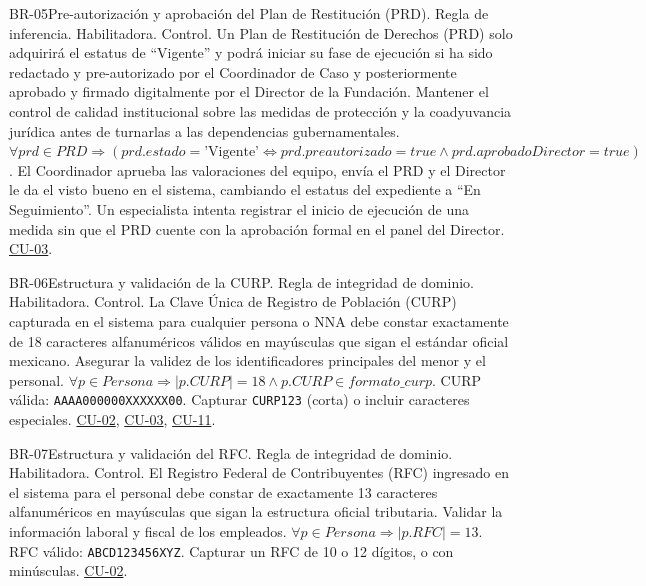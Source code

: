 \begin{BussinesRule}{BR-05}{Pre-autorización y aprobación del Plan de Restitución (PRD).}
	\BRitem[Tipo:] Regla de inferencia. 
	\BRitem[Clase:] Habilitadora. 
	\BRitem[Nivel:] Control.
	\BRitem[Descripción:] Un Plan de Restitución de Derechos (PRD) solo adquirirá el estatus de ``Vigente'' y podrá iniciar su fase de ejecución si ha sido redactado y pre-autorizado por el Coordinador de Caso y posteriormente aprobado y firmado digitalmente por el Director de la Fundación.
	\BRitem[Motivación:] Mantener el control de calidad institucional sobre las medidas de protección y la coadyuvancia jurídica antes de turnarlas a las dependencias gubernamentales.
	\BRitem[Sentencia:] $\forall prd \in PRD \Rightarrow (prd.estado = \mbox{'Vigente'} \Leftrightarrow prd.preautorizado = true \land prd.aprobadoDirector = true)$.
	 El Coordinador aprueba las valoraciones del equipo, envía el PRD y el Director le da el visto bueno en el sistema, cambiando el estatus del expediente a ``En Seguimiento''.
	 Un especialista intenta registrar el inicio de ejecución de una medida sin que el PRD cuente con la aprobación formal en el panel del Director.
	 \hyperlink{CU-03}{CU-03}.
\end{BussinesRule}

\begin{BussinesRule}{BR-06}{Estructura y validación de la CURP.}
	\BRitem[Tipo:] Regla de integridad de dominio.
	\BRitem[Clase:] Habilitadora.
	\BRitem[Nivel:] Control.
	\BRitem[Descripción:] La Clave Única de Registro de Población (CURP) capturada en el sistema para cualquier persona o NNA debe constar exactamente de 18 caracteres alfanuméricos válidos en mayúsculas que sigan el estándar oficial mexicano.
	\BRitem[Motivación:] Asegurar la validez de los identificadores principales del menor y el personal.
	\BRitem[Sentencia:] $\forall p \in Persona \Rightarrow |p.CURP| = 18 \land p.CURP \in formato\_curp$.
	 CURP válida: \texttt{AAAA000000XXXXXX00}.
	 Capturar \texttt{CURP123} (corta) o incluir caracteres especiales.
	 \hyperlink{CU-02}{CU-02}, \hyperlink{CU-03}{CU-03}, \hyperlink{CU-11}{CU-11}.
\end{BussinesRule}

\begin{BussinesRule}{BR-07}{Estructura y validación del RFC.}
	\BRitem[Tipo:] Regla de integridad de dominio.
	\BRitem[Clase:] Habilitadora.
	\BRitem[Nivel:] Control.
	\BRitem[Descripción:] El Registro Federal de Contribuyentes (RFC) ingresado en el sistema para el personal debe constar de exactamente 13 caracteres alfanuméricos en mayúsculas que sigan la estructura oficial tributaria.
	\BRitem[Motivación:] Validar la información laboral y fiscal de los empleados.
	\BRitem[Sentencia:] $\forall p \in Persona \Rightarrow |p.RFC| = 13$.
	 RFC válido: \texttt{ABCD123456XYZ}.
	 Capturar un RFC de 10 o 12 dígitos, o con minúsculas.
	 \hyperlink{CU-02}{CU-02}.
\end{BussinesRule}


